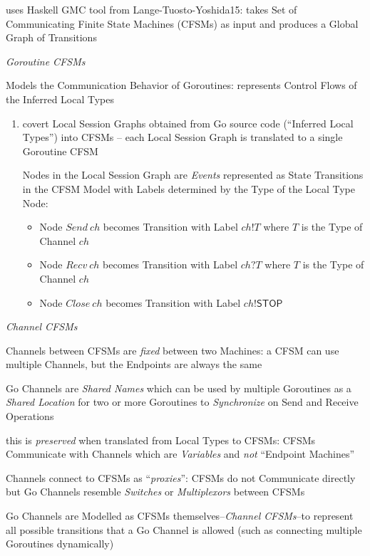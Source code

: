 uses Haskell GMC tool from Lange-Tuosto-Yoshida15: takes Set of
Communicating Finite State Machines (CFSMs) as input and produces a
Global Graph of Transitions


\emph{Goroutine CFSMs}

Models the Communication Behavior of Goroutines: represents Control
Flows of the Inferred Local Types

\begin{enumerate}
  \item covert Local Session Graphs obtained from Go source code
    (``Inferred Local Types'') into CFSMs -- each Local Session Graph
    is translated to a single Goroutine CFSM

    Nodes in the Local Session Graph are \emph{Events} represented as
    State Transitions in the CFSM Model with Labels determined by the
    Type of the Local Type Node:
    \begin{itemize}
      \item Node $Send\ ch$ becomes Transition with Label $ch!T$ where
        $T$ is the Type of Channel $ch$
      \item Node $Recv\ ch$ becomes Transition with Label $ch?T$ where
        $T$ is the Type of Channel $ch$
      \item Node $Close\ ch$ becomes Transition with Label
        $ch!\mathsf{STOP}$
    \end{itemize}
\end{enumerate}


\emph{Channel CFSMs}

Channels between CFSMs are \emph{fixed} between two Machines: a CFSM
can use multiple Channels, but the Endpoints are always the same

Go Channels are \emph{Shared Names} which can be used by multiple
Goroutines as a \emph{Shared Location} for two or more Goroutines to
\emph{Synchronize} on Send and Receive Operations

this is \emph{preserved} when translated from Local Types to CFSMs:
CFSMs Communicate with Channels which are \emph{Variables} and
\emph{not} ``Endpoint Machines''

Channels connect to CFSMs as ``\emph{proxies}'': CFSMs do not
Communicate directly but Go Channels resemble \emph{Switches} or
\emph{Multiplexors} between CFSMs

Go Channels are Modelled as CFSMs themselves--\emph{Channel CFSMs}--to
represent all possible transitions that a Go Channel is allowed (such
as connecting multiple Goroutines dynamically)

